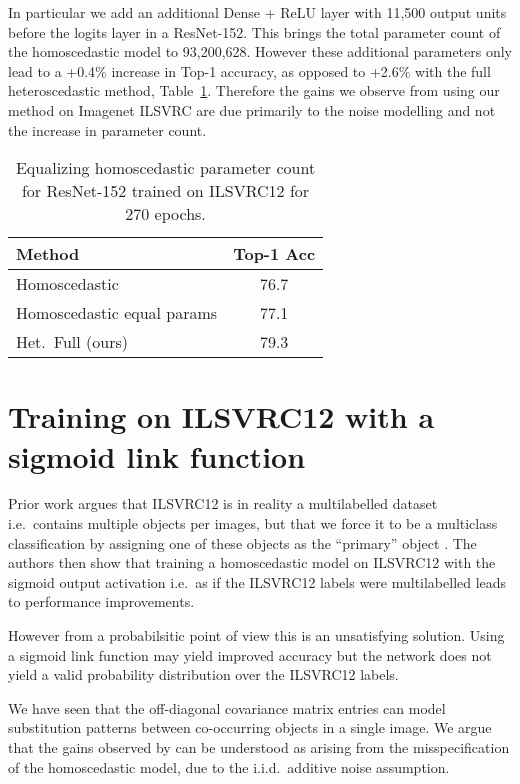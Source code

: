 \documentclass[final]{cvpr}
\begin{document}
In particular we add an additional Dense + ReLU layer with 11,500 output units before the logits layer in a ResNet-152. This brings the total parameter count of the homoscedastic model to 93,200,628. However these additional parameters only lead to a +0.4\% increase in Top-1 accuracy, as opposed to +2.6\% with the full heteroscedastic method, Table~\ref{table:equal_params_ilsvrc12}. Therefore the gains we observe from using our method on Imagenet ILSVRC are due primarily to the noise modelling and not the increase in parameter count.

\begin{table}[tbh]
\centering
\begin{tabular}{lc}
\toprule
Method & Top-1 Acc \\
\midrule
Homoscedastic & 76.7 \\
Homoscedastic equal params & 77.1 \\
Het.\ Full (ours) & 79.3 \\ 
\bottomrule
\end{tabular}
\caption{Equalizing homoscedastic parameter count for ResNet-152 trained on ILSVRC12 for 270 epochs.} 
\label{table:equal_params_ilsvrc12}
\end{table}

\section{Training on ILSVRC12 with a sigmoid link function}
\label{app:sigmoid_ilsvrc12}

Prior work argues that ILSVRC12 is in reality a multilabelled dataset i.e.\ contains multiple objects per images, but that we force it to be a multiclass classification by assigning one of these objects as the ``primary'' object \cite{beyer2020we}. The authors then show that training a homoscedastic model on ILSVRC12 with the sigmoid output activation i.e.\ as if the ILSVRC12 labels were multilabelled leads to performance improvements.

However from a probabilsitic point of view this is an unsatisfying  solution. Using a sigmoid link function may yield improved accuracy but the network does not yield a valid probability distribution over the ILSVRC12 labels.

We have seen that the off-diagonal covariance matrix entries can model substitution patterns between co-occurring objects in a single image. We argue that the gains observed by \citet{beyer2020we} can be understood as arising from the misspecification of the homoscedastic model, due to the i.i.d.\ additive noise assumption.
\end{document}
